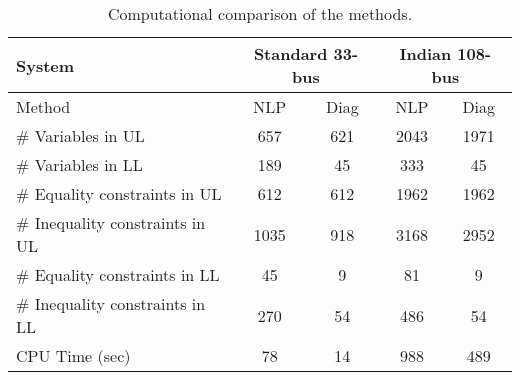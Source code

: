 \documentclass[journal]{IEEEtran}
\begin{document}
\begin{table}[!bt]
	\centering
		\renewcommand{\arraystretch}{1.3}
	\setlength\tabcolsep{2pt}
	\caption{Computational comparison of the methods.}
	\label{tab: Ch6_Compu com}
	\begin{tabular}{lcccc}
		\hline
		System                          & \multicolumn{2}{c}{Standard 33-bus}        & \multicolumn{2}{c}{Indian 108-bus}         \\ \hline
		Method                          & \multicolumn{1}{c}{NLP}  & Diag & \multicolumn{1}{c}{NLP}  & Diag \\ \hline
		\# Variables in UL              & \multicolumn{1}{c}{657}  & 621             & \multicolumn{1}{c}{2043} & 1971            \\ 
		\# Variables in LL              & \multicolumn{1}{c}{189}  & 45              & \multicolumn{1}{c}{333}  & 45              \\ 
		\# Equality constraints in UL   & \multicolumn{1}{c}{612}  & 612             & \multicolumn{1}{c}{1962} & 1962            \\ 
		\# Inequality constraints in UL & \multicolumn{1}{c}{1035} & 918             & \multicolumn{1}{c}{3168} & 2952            \\ 
		\# Equality constraints in LL   & \multicolumn{1}{c}{45}   & 9               & \multicolumn{1}{c}{81}   & 9               \\ 
		\# Inequality constraints in LL & \multicolumn{1}{c}{270}  & 54              & \multicolumn{1}{c}{486}  & 54              \\ 
		CPU Time (sec)                  & \multicolumn{1}{c}{78}   & 14              & \multicolumn{1}{c}{988}  & 489             \\ \hline
	\end{tabular}
\end{table}
\end{document}
